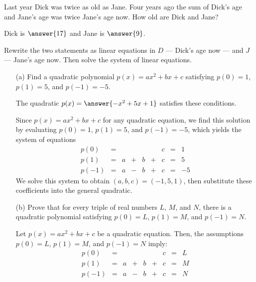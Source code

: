\documentclass{ximera}
\begin{document}
\begin{exercise} \label{c2.1.10}
Last year Dick was twice as old as Jane.  Four years ago the
sum of Dick's age and Jane's age was twice Jane's age now.  How
old are Dick and Jane?
\begin{prompt}
  Dick is $\answer{17}$ and Jane is $\answer{9}$.
\end{prompt}
\begin{hint}
  Rewrite the two statements
  as linear equations in $D$ --- Dick's age now --- and $J$ ---
  Jane's age now.  Then solve the system of linear equations.
\end{hint}
\end{exercise}

\begin{exercise} \label{c2.1.11}
\begin{itemize}
\item[(a)] Find a quadratic polynomial $p(x) = ax^2 + bx + c$
  satisfying $p(0) = 1$, $p(1) = 5$, and $p(-1) = -5$.
  \begin{prompt}
    The quadratic $p(x) = \answer{-x^2 + 5x + 1}$ satisfies these conditions.
  \end{prompt}
  \begin{hint}
    Since $p(x) = ax^2 + bx + c$ for any quadratic equation, we find
this solution by evaluating $p(0) = 1$, $p(1) = 5$, and $p(-1) = -5$,
which yields the system of equations
\[
\begin{array}{lrrrrrrrr}
p(0) & = & & & & & c & = & 1 \\
p(1) & = & a & + & b & + & c & = & 5 \\
p(-1) & = & a & - & b & + & c & = & -5\end{array}
\]
We solve this system to obtain $(a,b,c) = (-1,5,1)$, then substitute
these coefficients into the general quadratic.
  \end{hint}
\item[(b)] Prove that for every triple of real numbers $L$, $M$,
and $N$, there is a quadratic polynomial satisfying $p(0) = L$,
$p(1) = M$, and $p(-1) = N$.
\begin{hint}
   Let $p(x) = ax^2 + bx + c$ be a quadratic equation.  Then, the
assumptions $p(0) = L$, $p(1) = M$, and $p(-1) = N$ imply:
\[
\begin{array}{lrrrrrrrr}
p(0) & = & & & & & c & = & L \\
p(1) & = & a & + & b & + & c & = & M \\
p(-1) & = & a & - & b & + & c & = & N\end{array}
\]
\end{hint}
\end{itemize}
\end{exercise}
\end{document}
